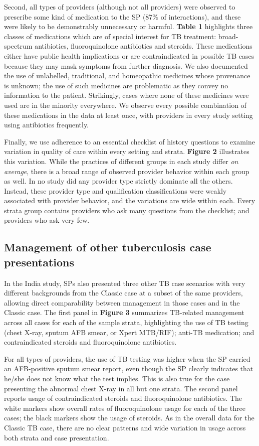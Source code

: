 \documentclass[fleqn,10pt]{wlscirep}
\begin{document}
Second, all types of providers (although not all providers) were observed to prescribe some kind of medication to the SP (87\% of interactions), and these were likely to be demonstrably unnecessary or harmful. \textbf{Table 1} highlights three classes of medications which are of special interest for TB treatment: broad-spectrum antibiotics, fluoroquinolone antibiotics and steroids. These medications either have public health implications or are contraindicated in possible TB cases because they may mask symptoms from further diagnosis. We also documented the use of unlabelled, traditional, and homeopathic medicines whose provenance is unknown; the use of such medicines are problematic as they convey no information to the patient. Strikingly, cases where none of these medicines were used are in the minority everywhere. We observe every possible combination of these medications in the data at least once, with providers in every study setting using antibiotics frequently.

Finally, we use adherence to an essential checklist of history questions to examine variation in quality of care within every setting and strata. \textbf{Figure 2} illustrates this variation. While the practices of different groups in each study differ \textit{on average}, there is a broad range of observed provider behavior within each group as well. In no study did any provider type strictly dominate all the others. Instead, these provider type and qualification classifications were weakly associated with provider behavior, and the variations are wide within each. Every strata group contains providers who ask many questions from the checklist; and providers who ask very few. 

\subsection*{Management of other tuberculosis case presentations}
In the India study, SPs also presented three other TB case scenarios with very different backgrounds from the Classic case at a subset of the same providers, allowing direct comparability between management in those cases and in the Classic case. The first panel in \textbf{Figure 3} summarizes TB-related management across all cases for each of the sample strata, highlighting the use of TB testing (chest X-ray, sputum AFB smear, or Xpert MTB/RIF); anti-TB medication; and contraindicated steroids and fluoroquinolone antibiotics.

For all types of providers, the use of TB testing was higher when the SP carried an AFB-positive sputum smear report, even though the SP clearly indicates that he/she does not know what the test implies. This is also true for the case presenting the abnormal chest X-ray in all but one strata. The second panel reports usage of contraindicated steroids and fluoroquinolone antibiotics. The white markers show overall rates of fluoroquinolone usage for each of the three cases; the black markers show the usage of steroids. As in the overall data for the Classic TB case, there are no clear patterns and wide variation in usage across both strata and case presentation.
\end{document}
